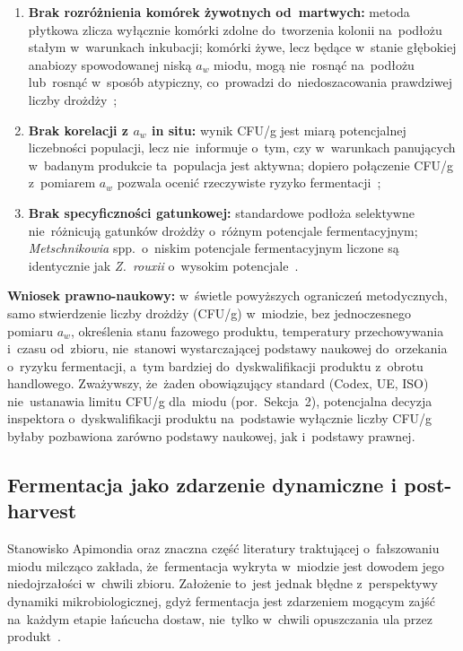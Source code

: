 \begin{enumerate}
    \item \textbf{Brak rozróżnienia komórek żywotnych od~martwych:}
          metoda płytkowa zlicza wyłącznie komórki zdolne do~tworzenia
          kolonii na~podłożu stałym w~warunkach inkubacji; komórki
          żywe, lecz będące w~stanie głębokiej anabiozy
          spowodowanej niską $a_w$ miodu, mogą nie~rosnąć
          na~podłożu lub~rosnąć w~sposób atypiczny, co~prowadzi
          do~niedoszacowania prawdziwej liczby
          drożdży~\cite{intechopen_microb2017};
    \item \textbf{Brak korelacji z $a_w$ in situ:} wynik CFU/g
          jest miarą potencjalnej liczebności populacji,
          lecz nie~informuje o~tym, czy w~warunkach panujących
          w~badanym produkcie ta~populacja jest aktywna;
          dopiero połączenie CFU/g z~pomiarem $a_w$ pozwala
          ocenić rzeczywiste ryzyko fermentacji~\cite{ruegg1981};
    \item \textbf{Brak specyficzności gatunkowej:} standardowe
          podłoża selektywne nie~różnicują gatunków drożdży
          o~różnym potencjale fermentacyjnym; \textit{Metschnikowia}
          spp.\ o~niskim potencjale fermentacyjnym liczone są
          identycznie jak \textit{Z.~rouxii} o~wysokim potencjale~\cite{rodriguezmachado2024}.
\end{enumerate}

\textbf{Wniosek prawno-naukowy:} w~świetle powyższych ograniczeń
metodycznych, samo stwierdzenie liczby drożdży (CFU/g) w~miodzie, bez jednoczesnego pomiaru $a_w$, określenia stanu fazowego
produktu, temperatury przechowywania i~czasu od~zbioru,
nie~stanowi wystarczającej podstawy naukowej do~orzekania
o~ryzyku fermentacji, a~tym bardziej do~dyskwalifikacji produktu
z~obrotu handlowego. Zważywszy, że~żaden obowiązujący standard
(Codex, UE, ISO) nie~ustanawia limitu CFU/g dla~miodu
(por.~Sekcja~2), potencjalna decyzja inspektora o~dyskwalifikacji
produktu na~podstawie wyłącznie liczby CFU/g byłaby pozbawiona
zarówno podstawy naukowej, jak i~podstawy prawnej.

\subsection{Fermentacja jako zdarzenie dynamiczne i post-harvest}

Stanowisko Apimondia oraz znaczna część literatury traktującej
o~fałszowaniu miodu milcząco zakłada, że~fermentacja wykryta
w~miodzie jest dowodem jego niedojrzałości w~chwili zbioru.
Założenie to~jest jednak błędne z~perspektywy dynamiki
mikrobiologicznej, gdyż fermentacja jest zdarzeniem mogącym
zajść na~każdym etapie łańcucha dostaw, nie~tylko w~chwili
opuszczania ula przez produkt~\cite{apinz2021,analytica2020}.

